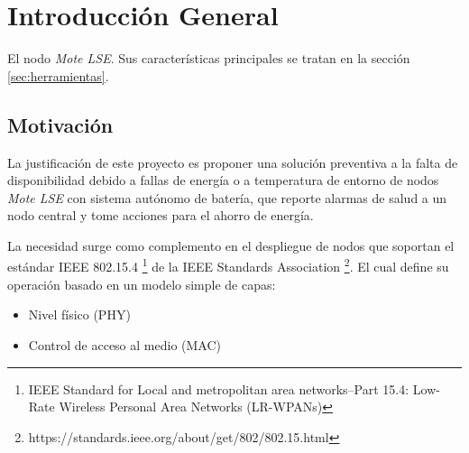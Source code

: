 
\chapter{Introducción General} %

\label{Chapter1} %
\label{IntroGeneral}


\newcommand{\keyword}[1]{\textbf{#1}}
\newcommand{\tabhead}[1]{\textbf{#1}}
\newcommand{\code}[1]{\texttt{#1}}
\newcommand{\file}[1]{\texttt{\bfseries#1}}
\newcommand{\option}[1]{\texttt{\itshape#1}}
\newcommand{\grados}{$^{\circ}$}


El nodo \textit{Mote LSE}. Sus características principales se tratan en la sección \ref{sec:herramientas}.


\section{Motivación}
\label{sec:Motivación}

La justificación de este proyecto es proponer una solución preventiva a la falta de disponibilidad debido a fallas de energía o a temperatura de entorno de nodos \textit{Mote LSE} con sistema autónomo de batería, que reporte alarmas de salud a un nodo central y tome acciones para el ahorro de energía.

La necesidad surge como complemento en el despliegue de nodos que soportan el estándar IEEE 802.15.4 \footnote{IEEE Standard for Local and metropolitan area networks--Part 15.4: Low-Rate Wireless Personal Area Networks (LR-WPANs)} de la IEEE Standards Association \footnote{https://standards.ieee.org/about/get/802/802.15.html}. El cual define su operación basado en un modelo simple de capas:
		\begin{itemize}
			\item Nivel físico (PHY)
			\item Control de acceso al medio (MAC)
		\end{itemize}

